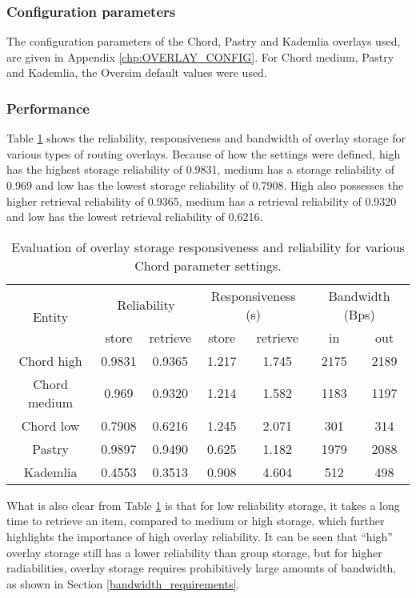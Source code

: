 \subsubsection{Configuration parameters}

The configuration parameters of the Chord, Pastry and Kademlia overlays used, are given in Appendix \ref{chp:OVERLAY_CONFIG}. For Chord medium, Pastry and Kademlia, the Oversim default values were used.

\subsubsection{Performance}

Table \ref{tab_overlay_rel_resp_results} shows the reliability, responsiveness and bandwidth of overlay storage for various types of routing overlays. Because of how the settings were defined, high has the highest storage reliability of 0.9831, medium has a storage reliability of 0.969 and low has the lowest storage reliability of 0.7908. High also possesses the higher retrieval reliability of 0.9365, medium has a retrieval reliability of 0.9320 and low has the lowest retrieval reliability of 0.6216.
%
\begin{table}[htbp]
\centering
\begin{tabular}{|c|c|c|c|c|c|c|}
\hline
\multirow{2}{*}{Entity}       & \multicolumn{2}{c|}{Reliability}    &\multicolumn{2}{c|}{Responsiveness (s)}& \multicolumn{2}{c|}{Bandwidth (Bps)}\\
\cline{2-7}
             &store & retrieve & store & retrieve     & in & out\\
\hline
Chord high   & 0.9831&0.9365 & 1.217&1.745  & 2175&2189 \\
Chord medium & 0.969&0.9320  & 1.214&1.582  & 1183&1197\\
Chord low    & 0.7908&0.6216 & 1.245&2.071  & 301 &314\\
Pastry       & 0.9897&0.9490 & 0.625&1.182  & 1979&2088\\
Kademlia     & 0.4553&0.3513 & 0.908&4.604  & 512 &498\\
\hline
\end{tabular}
\caption{Evaluation of overlay storage responsiveness and reliability for various Chord parameter settings.}
\label{tab_overlay_rel_resp_results}
\end{table}

What is also clear from Table \ref{tab_overlay_rel_resp_results} is that for low reliability storage, it takes a long time to retrieve an item, compared to medium or high storage, which further highlights the importance of high overlay reliability. It can be seen that ``high'' overlay storage still has a lower reliability than group storage, but for higher radiabilities, overlay storage requires prohibitively large amounts of bandwidth, as shown in Section \ref{bandwidth_requirements}.

